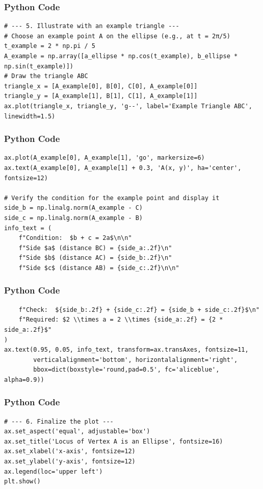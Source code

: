 \documentclass{beamer}
\begin{document}
\begin{frame}[fragile]
\frametitle{Python Code}
\begin{lstlisting}
# --- 5. Illustrate with an example triangle ---
# Choose an example point A on the ellipse (e.g., at t = 2π/5)
t_example = 2 * np.pi / 5
A_example = np.array([a_ellipse * np.cos(t_example), b_ellipse * np.sin(t_example)])
# Draw the triangle ABC
triangle_x = [A_example[0], B[0], C[0], A_example[0]]
triangle_y = [A_example[1], B[1], C[1], A_example[1]]
ax.plot(triangle_x, triangle_y, 'g--', label='Example Triangle ABC', linewidth=1.5)
\end{lstlisting}
\end{frame}

\begin{frame}[fragile]
\frametitle{Python Code}
\begin{lstlisting}
ax.plot(A_example[0], A_example[1], 'go', markersize=6)
ax.text(A_example[0], A_example[1] + 0.3, 'A(x, y)', ha='center', fontsize=12)

# Verify the condition for the example point and display it
side_b = np.linalg.norm(A_example - C)
side_c = np.linalg.norm(A_example - B)
info_text = (
    f"Condition:  $b + c = 2a$\n\n"
    f"Side $a$ (distance BC) = {side_a:.2f}\n"
    f"Side $b$ (distance AC) = {side_b:.2f}\n"
    f"Side $c$ (distance AB) = {side_c:.2f}\n\n"
\end{lstlisting}
\end{frame}

\begin{frame}[fragile]
\frametitle{Python Code}
\begin{lstlisting}
    f"Check:  ${side_b:.2f} + {side_c:.2f} = {side_b + side_c:.2f}$\n"
    f"Required: $2 \\times a = 2 \\times {side_a:.2f} = {2 * side_a:.2f}$"
)
ax.text(0.95, 0.05, info_text, transform=ax.transAxes, fontsize=11,
        verticalalignment='bottom', horizontalalignment='right',
        bbox=dict(boxstyle='round,pad=0.5', fc='aliceblue', alpha=0.9))
\end{lstlisting}
\end{frame}

\begin{frame}[fragile]
\frametitle{Python Code}
\begin{lstlisting}
# --- 6. Finalize the plot ---
ax.set_aspect('equal', adjustable='box')
ax.set_title('Locus of Vertex A is an Ellipse', fontsize=16)
ax.set_xlabel('x-axis', fontsize=12)
ax.set_ylabel('y-axis', fontsize=12)
ax.legend(loc='upper left')
plt.show()


\end{lstlisting}
\end{frame}
\end{document}
